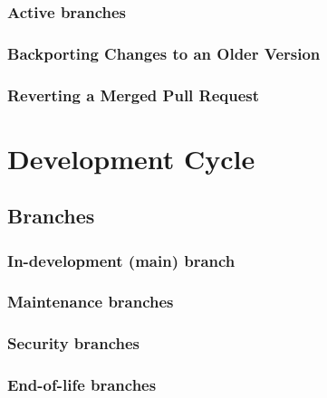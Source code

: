 \documentclass[]{book}
\begin{document}
\hypertarget{active-branches}{%
\subsection{Active branches}\label{active-branches}}

\hypertarget{backporting-changes-to-an-older-version}{%
\subsection{Backporting Changes to an Older Version}\label{backporting-changes-to-an-older-version}}

\hypertarget{reverting-a-merged-pull-request}{%
\subsection{Reverting a Merged Pull Request}\label{reverting-a-merged-pull-request}}

\hypertarget{development-cycle}{%
\chapter{Development Cycle}\label{development-cycle}}

\hypertarget{branches}{%
\section{Branches}\label{branches}}

\hypertarget{in-development-main-branch}{%
\subsection{In-development (main) branch}\label{in-development-main-branch}}

\hypertarget{maintenance-branches}{%
\subsection{Maintenance branches}\label{maintenance-branches}}

\hypertarget{security-branches}{%
\subsection{Security branches}\label{security-branches}}

\hypertarget{end-of-life-branches}{%
\subsection{End-of-life branches}\label{end-of-life-branches}}
\end{document}
